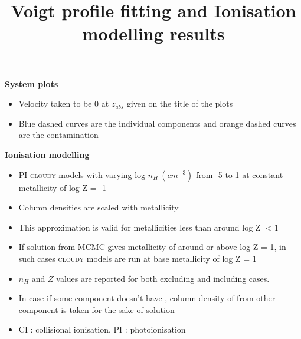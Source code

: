 \documentclass[12pt]{report}
\title{\textbf{Voigt profile fitting and Ionisation modelling results}}
\newcommand\ion[2]{\text{#1\,\textsc{\lowercase{#2}}}}
\begin{document}
\maketitle

\textbf{System plots} 

\begin{itemize}
    \item Velocity taken to be 0 at $z_{abs}$ given on the title of the plots
    \item Blue dashed curves are the individual components and orange dashed curves are the contamination
\end{itemize}

\textbf{Ionisation modelling} 

\begin{itemize}
    \item PI \textsc{cloudy} models with varying log $n_H \ (cm^{-3})$ from -5 to 1 at constant metallicity of log Z = -1
    \item Column densities are scaled with metallicity
    \item This approximation is valid for metallicities less than around log Z $<1$
    \item If solution from MCMC gives metallicity of around or above log Z = 1, in such cases \textsc{cloudy} models are run at base metallicity of log Z = 1 
    \item $n_H$ and $Z$ values are reported for both excluding and including \ion{O}{vi} cases.
    \item In case if some component doesn't have \ion{O}{vi}, column density of \ion{O}{vi} from other component is taken for the sake of solution
    \item CI : collisional ionisation,  PI : photoionisation
\end{itemize}


\newpage
\end{document}
